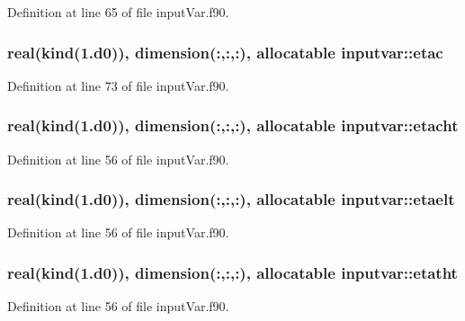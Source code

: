 Definition at line 65 of file input\-Var.\-f90.

\hypertarget{classinputvar_a983ea301ea452199170dcf1706f9262c}{
\subsubsection[{etac}]{\setlength{\rightskip}{0pt plus 5cm}real(kind(1.d0)), dimension(\-:,\-:,\-:), allocatable inputvar\-::etac}}\label{classinputvar_a983ea301ea452199170dcf1706f9262c}


Definition at line 73 of file input\-Var.\-f90.

\hypertarget{classinputvar_aacd2eb8dce4dc295c06a7cab54423174}{
\subsubsection[{etacht}]{\setlength{\rightskip}{0pt plus 5cm}real(kind(1.d0)), dimension(\-:,\-:,\-:), allocatable inputvar\-::etacht}}\label{classinputvar_aacd2eb8dce4dc295c06a7cab54423174}


Definition at line 56 of file input\-Var.\-f90.

\hypertarget{classinputvar_a369a3060de992f175783133d4a467699}{
\subsubsection[{etaelt}]{\setlength{\rightskip}{0pt plus 5cm}real(kind(1.d0)), dimension(\-:,\-:,\-:), allocatable inputvar\-::etaelt}}\label{classinputvar_a369a3060de992f175783133d4a467699}


Definition at line 56 of file input\-Var.\-f90.

\hypertarget{classinputvar_a258e931040b177ac64cb68a595378fe0}{
\subsubsection[{etatht}]{\setlength{\rightskip}{0pt plus 5cm}real(kind(1.d0)), dimension(\-:,\-:,\-:), allocatable inputvar\-::etatht}}\label{classinputvar_a258e931040b177ac64cb68a595378fe0}


Definition at line 56 of file input\-Var.\-f90.

